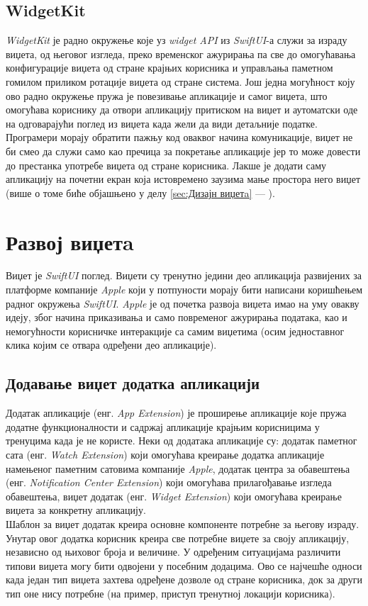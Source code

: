 \documentclass[12pt,oneside]{memoir}
\begin{document}
\subsection{WidgetKit}
\indent \textit{WidgetKit} је радно окружење које уз \textit{widget API} из  \textit{SwiftUI}-а служи за израду виџета, од његовог изгледа, преко временског ажурирања па све до омогућавања конфигурације виџета од стране крајњих корисника и управљања паметном гомилом приликом ротације виџета од стране система. Још једна могућност коју ово радно окружење пружа је повезивање апликације и самог виџета, што омогућава кориснику да отвори апликацију притиском на виџет и аутоматски оде на одговарајући поглед из виџета када жели да види детаљније податке. Програмери морају обратити пажњу код оваквог начина комуникације, виџет не би смео да служи само као пречица за покретање апликације јер то може довести до престанка употребе виџета од стране корисника. Лакше је додати саму апликацију на почетни екран која истовремено заузима мање простора него виџет (више о томе биће објашњено у делу \ref{sec:Дизајн виџетa} --- ).

\section{Развој виџетa}
\label{sec:Развој виџетa}
\indent Виџет је \textit{SwiftUI} поглед. Виџети су тренутно једини део апликација развијених за платформе компаније \textit{Apple} који у потпуности морају бити написани коришћењем радног окружења \textit{SwiftUI}. \textit{Apple} је од почетка развоја виџета имао на уму овакву идеју, због начина приказивања и само повременог ажурирања података, као и немогућности корисничке интеракције са самим виџетима (осим једноставног клика којим се отвара одређени део апликације).

\subsection{Додавање виџет додатка апликацији}
\indent Додатак апликације (енг. \textit{App Extension}) је проширење апликације које пружа додатне функционалности и садржај апликације крајњим корисницима у тренуцима када је не користе. Неки од додатака апликације су: додатак паметног сата (енг. \textit{Watch Extension}) који омогућава креирање додатка апликације намењеног паметним сатовима компаније \textit{Apple}, додатак центра за обавештења (енг. \textit{Notification Center Extension}) који омогућава прилагођавање изгледа обавештења, виџет додатак (енг. \textit{Widget Extension}) који омогућава креирање виџета за конкретну апликацију.
\\
\indent Шаблон за виџет додатак креира основне компоненте потребне за његову израду. Унутар овог додатка корисник креира све потребне виџете за своју апликацију, независно од њиховог броја и величине. У одређеним ситуацијама различити типови виџета могу бити одвојени у посебним додацима. Ово се најчешће односи када један тип виџета захтева одређене дозволе од стране корисника, док за други тип оне нису потребне (на пример, приступ тренутној локацији корисника).
\end{document}
